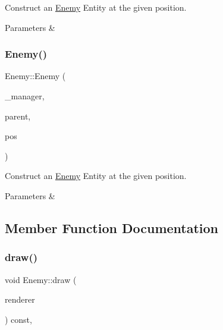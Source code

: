 Construct an \mbox{\hyperlink{class_enemy}{Enemy}} Entity at the given position. 


\begin{DoxyParams}{Parameters}
{\em } & \\
\hline
\end{DoxyParams}
\mbox{\label{class_enemy_aaa4ab19da21f8646613947e64c92d38a}} 
\subsubsection{\texorpdfstring{Enemy()}{Enemy()}\hspace{0.1cm}{\footnotesize\ttfamily [3/3]}}
{\footnotesize\ttfamily Enemy\+::\+Enemy (\begin{DoxyParamCaption}\item[{\mbox{\hyperlink{class_game_manager}{Game\+Manager}} $\ast$}]{\+\_\+manager,  }\item[{\mbox{\hyperlink{class_game_entity}{Game\+Entity}} $\ast$}]{parent,  }\item[{\mbox{\hyperlink{classsf_1_1_vector2}{sf\+::\+Vector2f}}}]{pos }\end{DoxyParamCaption})}



Construct an \mbox{\hyperlink{class_enemy}{Enemy}} Entity at the given position. 


\begin{DoxyParams}{Parameters}
{\em } & \\
\hline
\end{DoxyParams}


\subsection{Member Function Documentation}
\mbox{\label{class_enemy_a909cfc93e50506d0e2c62e5fd231e05a}} 
\subsubsection{\texorpdfstring{draw()}{draw()}}
{\footnotesize\ttfamily void Enemy\+::draw (\begin{DoxyParamCaption}\item[{\mbox{\hyperlink{classsf_1_1_render_target}{sf\+::\+Render\+Target}} \&}]{renderer }\end{DoxyParamCaption}) const\hspace{0.3cm}{\ttfamily [override]}, {\ttfamily [virtual]}}



